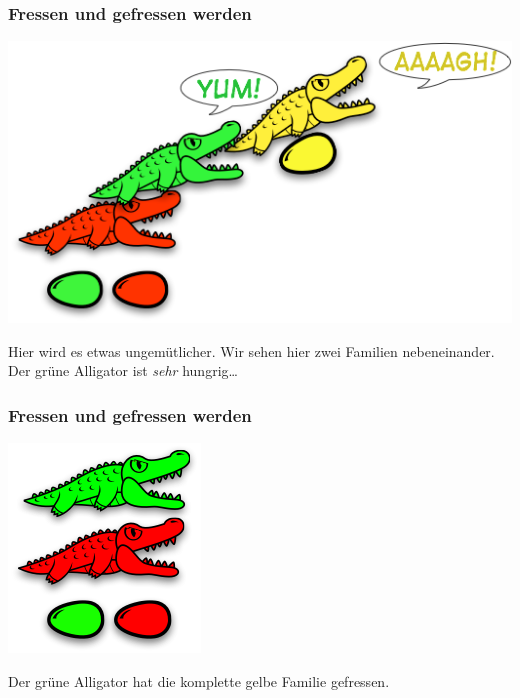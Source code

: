 \documentclass{beamer}
\begin{document}

\begin{frame}
\frametitle{Fressen und gefressen werden}

\begin{center}
\includegraphics[scale=0.45]{eating_3.png} 
\end{center}
\bigskip

Hier wird es etwas ungemütlicher. Wir sehen hier zwei Familien nebeneinander. Der grüne Alligator ist \emph{sehr} hungrig\dots
\end{frame}


\begin{frame}
\begin{multicols}{2}
\frametitle{Fressen und gefressen werden}

\begin{center}
\includegraphics[scale=0.45]{families_2.png} 
\end{center}
\columnbreak

Der grüne Alligator hat die komplette gelbe Familie gefressen.

\end{multicols}
\end{frame}
\end{document}
